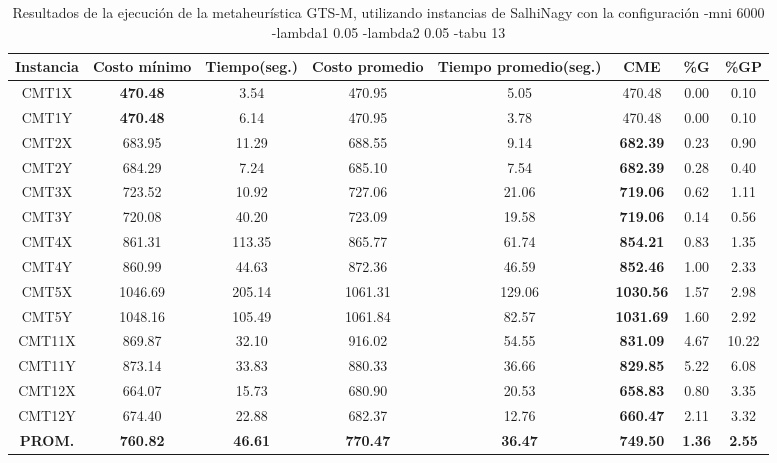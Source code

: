 \begin{table}[h]
\caption{Resultados de la ejecución de la metaheurística GTS-M, utilizando instancias de SalhiNagy con la configuración -mni 6000 -lambda1 0.05 -lambda2 0.05 -tabu 13}
\centering
\small
\begin{tabular}{c c c c c c c c}
\hline\hline
Instancia & Costo mínimo & Tiempo(seg.) & Costo promedio & Tiempo promedio(seg.) & CME & \%G & \%GP \\ [0.5ex]
\hline
CMT1X & \bf{470.48} & 3.54 & 
470.95 & 5.05 & 470.48 & 0.00
 & 0.10\\CMT1Y & \bf{470.48} & 6.14 & 
470.95 & 3.78 & 470.48 & 0.00
 & 0.10\\CMT2X & 683.95 & 11.29 & 
688.55 & 9.14 & \bf{682.39} & 
0.23 & 0.90\\CMT2Y & 684.29 & 7.24 & 
685.10 & 7.54 & \bf{682.39} & 
0.28 & 0.40\\CMT3X & 723.52 & 10.92 & 
727.06 & 21.06 & \bf{719.06} & 
0.62 & 1.11\\CMT3Y & 720.08 & 40.20 & 
723.09 & 19.58 & \bf{719.06} & 
0.14 & 0.56\\CMT4X & 861.31 & 113.35 & 
865.77 & 61.74 & \bf{854.21} & 
0.83 & 1.35\\CMT4Y & 860.99 & 44.63 & 
872.36 & 46.59 & \bf{852.46} & 
1.00 & 2.33\\CMT5X & 1046.69 & 205.14 & 
1061.31 & 129.06 & \bf{1030.56} & 
1.57 & 2.98\\CMT5Y & 1048.16 & 105.49 & 
1061.84 & 82.57 & \bf{1031.69} & 
1.60 & 2.92\\CMT11X & 869.87 & 32.10 & 
916.02 & 54.55 & \bf{831.09} & 
4.67 & 10.22\\CMT11Y & 873.14 & 33.83 & 
880.33 & 36.66 & \bf{829.85} & 
5.22 & 6.08\\CMT12X & 664.07 & 15.73 & 
680.90 & 20.53 & \bf{658.83} & 
0.80 & 3.35\\CMT12Y & 674.40 & 22.88 & 
682.37 & 12.76 & \bf{660.47} & 
2.11 & 3.32\\\bf{PROM.} & 
\bf{760.82} & \bf{46.61} & \bf{770.47} & \bf{36.47} & \bf{749.50} & \bf{1.36} & \bf{2.55}\\[1ex]\hline
\end{tabular}
\label{table:nonlin}
\end{table} 

